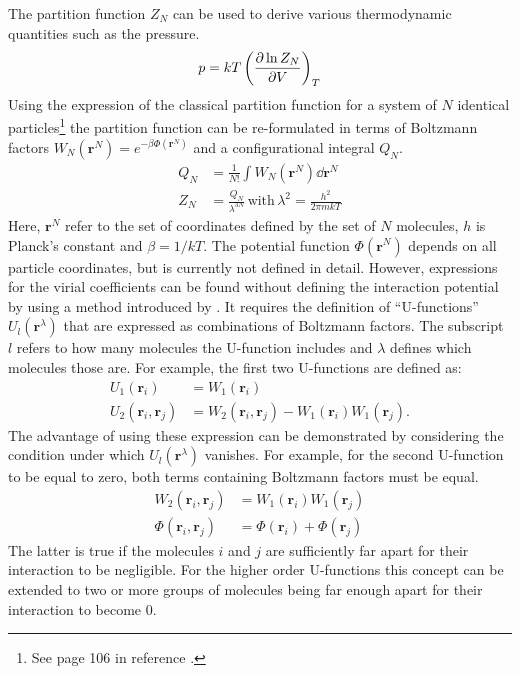 The partition function $Z_N$ can be used to derive various thermodynamic quantities
such as the pressure.
%
\begin{align}
    p=kT\left(\pdv{\ln Z_N}{V}\right)_T\label{eqn:PressureEquationOfState}
\end{align}
%
Using the expression of the classical partition function for a system of $N$
identical particles\footnote{See page 106 in reference
\cite{Hirschfelder_Moleculartheorygases_1964}.} the partition function can be
re-formulated in terms of Boltzmann factors
$W_N\left(\mathbf{r}^N\right)=e^{-\beta\Phi\left(\mathbf{r}^N\right)}$ and a
configurational integral $Q_N$.
%
\begin{align}
    Q_N&=\frac{1}{N!}\int W_N\left(\mathbf{r}^N\right)\dd{\mathbf{r}^N}\label{eqn:ConfigurationalIntegral}\\
    Z_N&=\frac{Q_N}{\lambda^{3N}}\,\text{with}\, \lambda^2=\frac{h^2}{2\pi mkT}\label{eqn:PartitionFunction}
\end{align}
%
Here, $\mathbf{r}^N$ refer to the set of coordinates defined by the set of $N$
molecules, $h$ is Planck's constant and $\beta=1/kT$. The potential function
$\Phi\left(\mathbf{r}^N\right)$ depends on all particle coordinates, but is
currently not defined in detail. However, expressions for the virial
coefficients can be found without defining the interaction potential by using a
method introduced by
\citeauthor{Ursell_evaluationGibbsphaseintegral_1927}\autocite{Ursell_evaluationGibbsphaseintegral_1927}.
It requires the definition of ``U-functions''
$U_l\left(\mathbf{r}^\lambda\right)$ that are expressed as combinations of
Boltzmann factors. The subscript $l$ refers to how many molecules the
U-function includes and $\lambda$ defines which molecules those are. For
example, the first two U-functions are defined as:
%
\begin{align}
    U_1\left(\mathbf{r}_i\right)&=W_1\left(\mathbf{r}_i\right)\\
    U_2\left(\mathbf{r}_i,\mathbf{r}_j\right)&=W_2\left(\mathbf{r}_i,\mathbf{r}_j\right)-W_1\left(\mathbf{r}_i\right)W_1\left(\mathbf{r}_j\right).
\end{align}
%
The advantage of using these expression can be demonstrated by considering the
condition under which $U_l\left(\mathbf{r}^\lambda\right)$ vanishes. For
example, for the second U-function to be equal to zero, both terms containing
Boltzmann factors must be equal.
%
\begin{align}
    W_2\left(\mathbf{r}_i,\mathbf{r}_j\right)&=W_1\left(\mathbf{r}_i\right)W_1\left(\mathbf{r}_j\right)\\
    \Phi\left(\mathbf{r}_i,\mathbf{r}_j\right)&=\Phi\left(\mathbf{r}_i\right)+\Phi\left(\mathbf{r}_j\right)
\end{align}
%
The latter is true if the molecules $i$ and $j$ are sufficiently far apart for
their interaction to be negligible. For the higher order U-functions this
concept can be extended to two or more groups of molecules being far enough
apart for their interaction to become 0.

